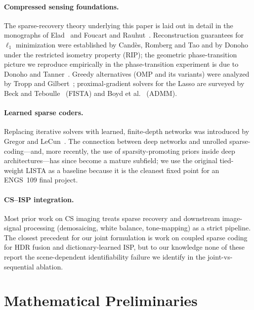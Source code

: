 \documentclass{article}
\begin{document}
\paragraph{Compressed sensing foundations.} The sparse-recovery theory underlying this paper is laid out in detail in the monographs of Elad~\citep{elad2010sparse} and Foucart and Rauhut~\citep{foucart2013mathematical}. Reconstruction guarantees for $\ell_1$ minimization were established by Cand\`es, Romberg and Tao and by Donoho~\citep{candes2006stable,donoho2006compressed} under the restricted isometry property (RIP); the geometric phase-transition picture we reproduce empirically in the phase-transition experiment is due to Donoho and Tanner~\citep{donoho2009observed}. Greedy alternatives (OMP and its variants) were analyzed by Tropp and Gilbert~\citep{tropp2007signal}; proximal-gradient solvers for the Lasso are surveyed by Beck and Teboulle~\citep{beck2009fast} (FISTA) and Boyd et al.~\citep{boyd2011distributed} (ADMM).

\paragraph{Learned sparse coders.} Replacing iterative solvers with learned, finite-depth networks was introduced by Gregor and LeCun~\citep{gregor2010lista}. The connection between deep networks and unrolled sparse-coding---and, more recently, the use of sparsity-promoting priors inside deep architectures---has since become a mature subfield; we use the original tied-weight LISTA as a baseline because it is the cleanest fixed point for an ENGS~109 final project.

\paragraph{CS--ISP integration.} Most prior work on CS imaging treats sparse recovery and downstream image-signal processing (demosaicing, white balance, tone-mapping) as a strict pipeline. The closest precedent for our joint formulation is work on coupled sparse coding for HDR fusion and dictionary-learned ISP, but to our knowledge none of these report the scene-dependent identifiability failure we identify in the joint-vs-sequential ablation.

\section{Mathematical Preliminaries}
\label{sec:prelim}
\end{document}
